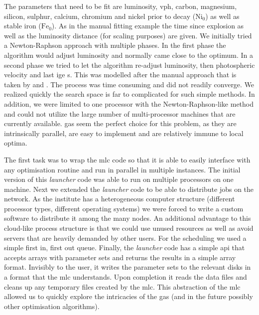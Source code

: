 The parameters that need to be fit are luminosity, \gls{vph}, carbon, magnesium, silicon, sulphur, calcium, chromium and nickel prior to decay ($\textrm{Ni}_0$) as well as stable iron ($\textrm{Fe}_0$). As in the manual fitting example the time since explosion as well as the luminosity distance (for scaling purposes) are given. We initially tried a Newton-Raphson approach with multiple phases. In the first phase the algorithm would adjust luminosity and normally came close to the optimum. In a second phase we tried to let the algorithm re-adjust luminosity, then photospheric velocity and last \gls{ige} s. This was modelled after the manual approach that is taken by \citet{hachinger_dipl2007} and \citep{hachinger_phd2011}. The process was time consuming and did not readily converge. We realized quickly the search space is far to complicated for such simple methods. In addition, we were limited to one processor with the Newton-Raphson-like method and could not utilize the large number of multi-processor machines that are currently available. \glspl{ga} seem the perfect choice for this problem, as they are intrinsically parallel, are easy to implement and are relatively immune to local optima.

The first task was to wrap the \gls{mlc} code so that it is able to easily interface with any optimisation routine and run in parallel in multiple instances. The initial version of this \emph{launcher} code was able to run on multiple processors on one machine. Next we extended the \emph{launcher} code to be able to distribute jobs on the network. As the institute has a heterogeneous computer structure (different processor types, different operating systems) we were forced to write a custom software to distribute it among the many nodes. An additional advantage to this cloud-like process structure is that we could use unused resources as well as avoid servers that are heavily demanded by other users. For the scheduling we used a simple first in, first out queue. Finally, the \emph{launcher} code has a simple \gls{api} that accepts arrays with parameter sets and returns the results in a simple array format. Invisibly to the user, it writes the parameter sets to the relevant disks in a format that the \gls{mlc} understands. Upon completion it reads the data files and cleans up any temporary files created by the \gls{mlc}. This abstraction of the \gls{mlc} allowed us to quickly explore the intricacies of the \glspl{ga} (and in the future possibly other optimisation algorithms).


